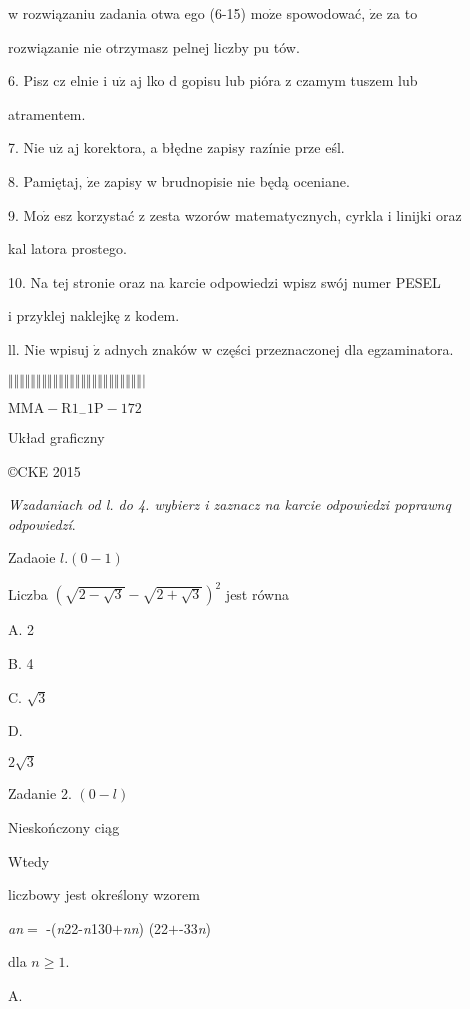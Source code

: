 \documentclass[a4paper,12pt]{article}
\begin{document}
w rozwiązaniu zadania otwa ego (6-15) $\mathrm{m}\mathrm{o}\dot{\mathrm{z}}\mathrm{e}$ spowodować, $\dot{\mathrm{z}}\mathrm{e}$ za to

rozwiązanie nie otrzymasz pelnej liczby pu tów.

6. Pisz cz elnie i $\mathrm{u}\dot{\mathrm{z}}$ aj lko $\mathrm{d}$ gopisu lub pióra z czamym tuszem lub

atramentem.

7. Nie $\mathrm{u}\dot{\mathrm{z}}$ aj korektora, a błędne zapisy razínie prze eśl.

8. Pamiętaj, $\dot{\mathrm{z}}\mathrm{e}$ zapisy w brudnopisie nie będą oceniane.

9. $\mathrm{M}\mathrm{o}\dot{\mathrm{z}}$ esz korzystać z zesta wzorów matematycznych, cyrkla i linijki oraz

kal latora prostego.

10. Na tej stronie oraz na karcie odpowiedzi wpisz swój numer PESEL

i przyklej naklejkę z kodem.

ll. Nie wpisuj $\dot{\mathrm{z}}$ adnych znaków w części przeznaczonej dla egzaminatora.

$\Vert\Vert\Vert\Vert\Vert\Vert\Vert\Vert\Vert\Vert\Vert\Vert\Vert\Vert\Vert\Vert\Vert\Vert\Vert\Vert\Vert\Vert\Vert\Vert|$

$\mathrm{M}\mathrm{M}\mathrm{A}-\mathrm{R}1_{-}1\mathrm{P}-172$

Układ graficzny

\copyright CKE 2015




{\it Wzadaniach od l. do 4. wybierz i zaznacz na karcie odpowiedzi poprawnq odpowiedzí}.

Zadaoie $l.(0-1)$

Liczba $(\sqrt{2-\sqrt{3}}-\sqrt{2+\sqrt{3}})^{2}$ jest równa

A. 2

B. 4

C. $\sqrt{3}$

D.

$2\sqrt{3}$

Zadanie 2. $(0-l)$

Nieskończony ciąg

Wtedy

liczbowy jest określony wzorem

{\it an}$=$ -({\it n}22-{\it n}130$+${\it nn}) (22$+$-33{\it n})

dla $n\geq 1.$

A.
\end{document}
